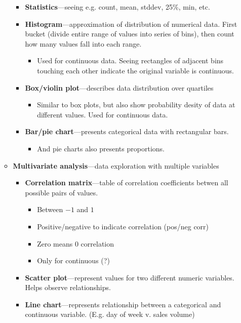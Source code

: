 \begin{itemize}
\begin{itemize}
    \begin{itemize}
        \item
      \textbf{Statistics}---seeing e.g. count, mean, stddev, 25\%, min,
      etc.
    \item
      \textbf{Histogram}---approximation of distribution of numerical
      data. First bucket (divide entire range of values into series of
      bins), then count how many values fall into each range.

      \begin{itemize}
            \item
        Used for continuous data. Seeing rectangles of adjacent bins
        touching each other indicate the original variable is
        continuous.
      \end{itemize}
    \item
      \textbf{Box/violin plot}---describes data distribution over
      quartiles

      \begin{itemize}
            \item
        Similar to box plots, but also show probability desity of data
        at different values. Used for continuous data.
      \end{itemize}
    \item
      \textbf{Bar/pie chart}---presents categorical data with
      rectangular bars.

      \begin{itemize}
            \item
        And pie charts also presents proportions.
      \end{itemize}
    \end{itemize}
  \item
    \textbf{Multivariate analysis}---data exploration with multiple
    variables

    \begin{itemize}
        \item
      \textbf{Correlation matrix}---table of correlation coefficients
      betwen all possible pairs of values.

      \begin{itemize}
            \item
        Between {\(- 1\)} and {\(1\)}
      \item
        Positive/negative to indicate correlation (pos/neg corr)
      \item
        Zero means 0 correlation
      \item
        Only for continuous (?)
      \end{itemize}
    \item
      \textbf{Scatter plot}---represent values for two different numeric
      variables. Helps observe relationships.
    \item
      \textbf{Line chart}---represents relationship between a
      categorical and continuous variable. (E.g. day of week v. sales
      volume)
    \end{itemize}
  \end{itemize}
\end{itemize}
